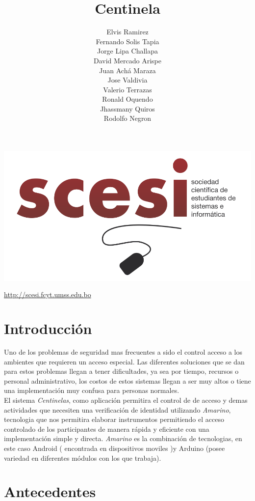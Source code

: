 \documentclass[letter,12pt]{article}
\title{Centinela}
\author{
	Elvis Ramirez 			\\ 
	Fernando Solis Tapia	\\ 
	Jorge Lipa Challapa		\\ 
	David Mercado Arispe	\\ 
	Juan Ach\'a Maraza		\\ 
	Jose Valdivia			\\ 
	Valerio Terrazas		\\
	Ronald Oquendo			\\
	Jhassmany Quiros		\\
	Rodolfo Negron			\\				
}
\begin{document}
\maketitle
\begin{center}
    \includegraphics[width=1.0\textwidth]{logo.png} 
\end{center}
\begin{center}
    \url {http://scesi.fcyt.umss.edu.bo}
\end{center}
\pagebreak
\tableofcontents
\pagebreak
\section{Introducci\'on}

Uno de los problemas de seguridad mas frecuentes a sido el control acceso a los ambientes que requieren un acceso especial. Las diferentes soluciones que se dan para estos problemas llegan a tener dificultades, ya sea por tiempo, recursos o personal administrativo, los costos de estos sistemas llegan a ser muy altos o tiene una implementaci\'on muy confusa para personas normales. \\

El sistema \textit{Centinelas}, como aplicaci\'on permitira el control de de acceso y demas actividades que necesiten una verificaci\'on de identidad utilizando \textit{Amarino}, tecnologia que nos permitira elaborar instrumentos permitiendo el acceso controlado de los participantes de manera r\'apida y eficiente con una implementaci\'on simple y directa. \textit{Amarino} es la combinaci\'on de tecnologias, en este caso Android ( encontrada en dispositivos moviles )y Arduino (posee variedad en diferentes m\'odulos con los que trabaja).

\section{Antecedentes}
\end{document}
